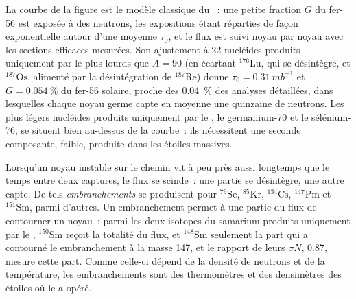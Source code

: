 La courbe de la figure est le modèle classique du ~: une petite
fraction $G$ du fer-56 est exposée à des neutrons, les expositions étant réparties
de façon exponentielle autour d'une moyenne $\tau_0$, et le flux est suivi noyau par
noyau avec les sections efficaces mesurées. Son ajustement à 22
nucléides produits uniquement par le  plus lourds que $A = 90$ (en écartant $^{176}\mathrm{Lu}$, qui
se désintègre, et $^{187}\mathrm{Os}$, alimenté par la désintégration de
$^{187}\mathrm{Re}$) donne $\tau_0 = \qty{0.31}{mb^{-1}}$ et
$G = \qty{0.054}{\percent}$ du fer-56 solaire, proche des
\qty{0.04}{\percent} des analyses détaillées, dans lesquelles chaque noyau germe
capte en moyenne une quinzaine de neutrons. Les plus légers
nucléides produits uniquement par le , le germanium-70 et le sélénium-76, se situent bien au-dessus de la courbe~: ils
nécessitent une seconde composante, faible, produite dans les étoiles massives.

Lorsqu'un noyau instable sur le chemin vit à peu près aussi longtemps que le temps
entre deux captures, le flux se scinde~: une partie se désintègre, une autre capte.
De tels \emph{embranchements} se produisent pour $^{79}\mathrm{Se}$, $^{85}\mathrm{Kr}$,
$^{134}\mathrm{Cs}$, $^{147}\mathrm{Pm}$ et $^{151}\mathrm{Sm}$, parmi
d'autres. Un embranchement permet à une partie du flux de contourner un noyau~: parmi les deux
isotopes du samarium produits uniquement par le , $^{150}\mathrm{Sm}$ reçoit la totalité
du flux, et $^{148}\mathrm{Sm}$ seulement la part qui a contourné le
embranchement à la masse 147, et le rapport de leurs $\sigma N$, \num{0.87},
mesure cette part. Comme celle-ci dépend de la densité de neutrons et
de la température, les embranchements sont des thermomètres et des densimètres des
étoiles où le  a opéré.

